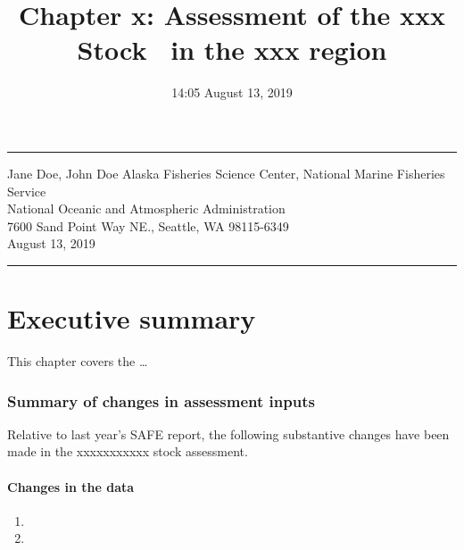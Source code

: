 \documentclass[11pt,]{article}
\title{Chapter x: Assessment of the xxx Stock ~in the xxx region}
\author{}
\date{14:05 August 13, 2019}
\let\oldparagraph\paragraph
\renewcommand{\paragraph}[1]{\oldparagraph{#1}\mbox{}}
\begin{document}
\maketitle

{
\setcounter{tocdepth}{2}
\tableofcontents
}

\begin{center}\rule{0.5\linewidth}{\linethickness}\end{center}

\begin{centering}
  Jane Doe, John Doe 
\fontsize{10}{12}
\selectfont
  Alaska Fisheries Science Center, National Marine Fisheries Service \\
  National Oceanic and Atmospheric Administration \\ 
  7600 Sand Point Way NE., Seattle, WA 98115-6349 \\
August 13, 2019 \\
\end{centering}

\begin{center}\rule{0.5\linewidth}{\linethickness}\end{center}

\hypertarget{executive-summary}{%
\section{Executive summary}\label{executive-summary}}

This chapter covers the \ldots{}

\hypertarget{summary-of-changes-in-assessment-inputs}{%
\subsubsection{Summary of changes in assessment
inputs}\label{summary-of-changes-in-assessment-inputs}}

Relative to last year's SAFE report, the following substantive changes
have been made in the xxxxxxxxxxx stock assessment.

\hypertarget{changes-in-the-data}{%
\paragraph{Changes in the data}\label{changes-in-the-data}}

\begin{enumerate}
\def\labelenumi{\arabic{enumi}.}
\item
\item
\end{enumerate}
\end{document}
